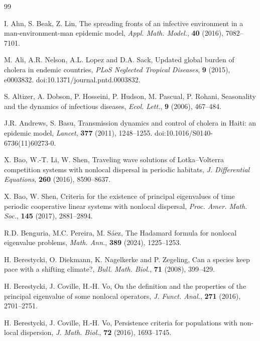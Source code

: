 \documentclass[a4paper,11pt]{amsart}
\theoremstyle{definition}
\numberwithin{equation}{section}
\theoremstyle{definition}
\begin{document}
\begin{thebibliography}{99}

I. Ahn, S. Beak, Z. Lin,
The spreading fronts of an infective environment in a man-environment-man epidemic model,
\textit{Appl. Math. Model.}, \textbf{40} (2016), 7082--7101.



M. Ali, A.R. Nelson, A.L. Lopez and D.A. Sack,
Updated global burden of cholera in endemic countries,
\textit{PLoS Neglected Tropical Diseases}, \textbf{9} (2015), e0003832.
doi:10.1371/journal.pntd.0003832.

S. Altizer, A. Dobson, P. Hosseini, P. Hudson, M. Pascual, P. Rohani,
Seasonality and the dynamics of infectious diseases,
\textit{Ecol. Lett.}, \textbf{9} (2006), 467--484.

J.R. Andrews, S. Basu,
Transmission dynamics and control of cholera in Haiti: an epidemic model,
\textit{Lancet}, \textbf{377} (2011), 1248--1255.
doi:10.1016/S0140-6736(11)60273-0.

X. Bao, W.-T. Li, W. Shen,
Traveling wave solutions of Lotka--Volterra competition systems with nonlocal dispersal in periodic habitats,
\textit{J. Differential Equations}, \textbf{260} (2016), 8590--8637.

X. Bao, W. Shen,
Criteria for the existence of principal eigenvalues of time periodic cooperative linear systems with nonlocal dispersal,
\textit{Proc. Amer. Math. Soc.}, \textbf{145} (2017), 2881--2894.

R.D. Benguria, M.C. Pereira, M. Sáez,
The Hadamard formula for nonlocal eigenvalue problems,
\textit{Math. Ann.}, \textbf{389} (2024), 1225--1253.


H. Berestycki, O. Diekmann, K. Nagelkerke and P. Zegeling,
Can a species keep pace with a shifting climate?,
\textit{Bull. Math. Biol.}, \textbf{71} (2008), 399--429.

H. Berestycki, J. Coville, H.-H. Vo,
On the definition and the properties of the principal eigenvalue of some nonlocal operators,
\textit{J. Funct. Anal.}, \textbf{271} (2016), 2701--2751.

H. Berestycki, J. Coville, H.-H. Vo,
Persistence criteria for populations with non-local dispersion,
\textit{J. Math. Biol.}, \textbf{72} (2016), 1693--1745.




\end{thebibliography}
\end{document}
